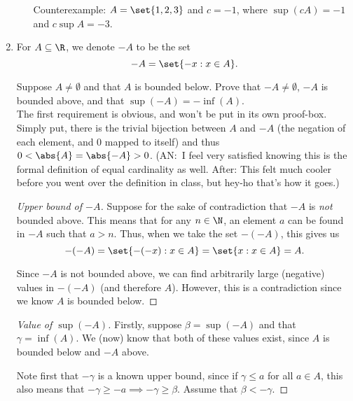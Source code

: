 \documentclass{article}
\begin{document}
\begin{enumerate}
\begin{enumerate}
                Counterexample: $A = \set{1, 2, 3}$ and $c = -1$, where $\sup(cA) = -1$ and $c \sup A = -3$.
        \end{enumerate}


  \item For $A \subseteq \R$, we denote $-A$ to be the set
        \begin{equation*}
          -A = \set{ -x: x \in A }.
        \end{equation*}

        Suppose $A \ne \emptyset$ and that $A$ is bounded below.
        Prove that $-A \ne \emptyset$, $-A$ is bounded above,
        and that $\sup(-A) = -\inf(A)$.\\

        The first requirement is obvious, and won't be put in its own proof-box.
        Simply put, there is the trivial bijection between $A$ and $-A$ (the negation of each element, and 0 mapped to itself) and thus
        $0 < \abs{A} = \abs{-A} > 0$.
        (AN:\ I feel very satisfied knowing this is the formal definition of equal cardinality as well.
        After: This felt much cooler before you went over the definition in class, but hey-ho that's how it goes.)

        \begin{proof}[Upper bound of $-A$]
          Suppose for the sake of contradiction that $-A$ is \textit{not} bounded above.
          This means that for any $n \in \N$, an element $a$ can be found in $-A$ such that $a > n$.
          Thus, when we take the set $-(-A)$, this gives us
          \begin{equation*}
            -(-A) = \set{ -(-x) : x \in A } = \set{ x : x \in A } = A.
          \end{equation*}

          Since $-A$ is not bounded above, we can find arbitrarily large (negative) values in $-(-A)$ (and therefore $A$). However, this
          is a contradiction since we know $A$ is bounded below.
        \end{proof}

        \begin{proof}[Value of $\sup(-A)$]
          Firstly, suppose $\beta = \sup(-A)$ and that $\gamma = \inf(A)$.
          We (now) know that both of these values exist, since $A$ is bounded below and $-A$ above.

          Note first that $-\gamma$ is a known upper bound, since if $\gamma \le a$ for all $a \in A$,
          this also means that $-\gamma \ge -a \implies -\gamma \ge \beta$. Assume that $\beta < -\gamma$.


\end{proof}
\end{enumerate}
\end{document}
